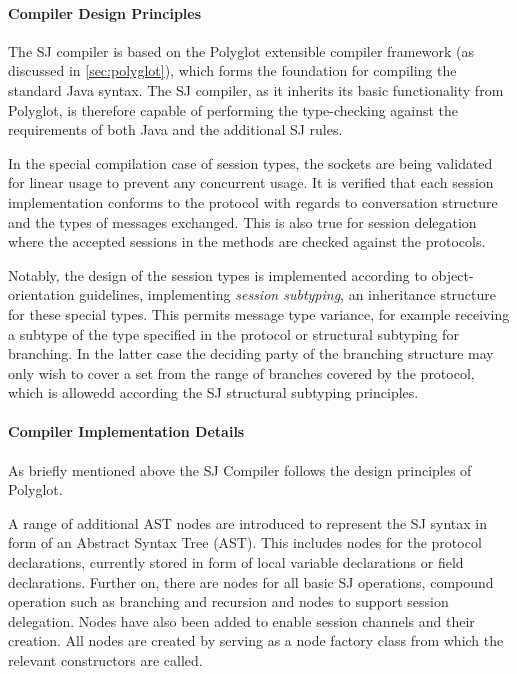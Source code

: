 \paragraph*{Compiler Design Principles}
The SJ compiler is based on the Polyglot extensible compiler framework (as discussed in \autoref{sec:polyglot}), which forms the foundation for compiling the standard Java syntax. The SJ compiler, as it inherits its basic functionality from Polyglot, is therefore capable of performing the type-checking against the requirements of both Java and the additional SJ rules. 

In the special compilation case of session types, the sockets are being validated for linear usage to prevent any concurrent usage. It is verified that each session implementation conforms to the protocol with regards to conversation structure and the types of messages exchanged. This is also true for session delegation where the accepted sessions in the methods are checked against the protocols.

Notably, the design of the session types is implemented according to object-orientation guidelines, implementing \textit{session subtyping}, an inheritance structure for these special types. This permits message type variance, for example receiving a subtype of the type specified in the protocol or structural subtyping for branching. In the latter case the deciding party of the branching structure may only wish to cover a set from the range of branches covered by the protocol, which is allowedd according the SJ structural subtyping principles.

\paragraph*{Compiler Implementation Details}
As briefly mentioned above the SJ Compiler follows the design principles of Polyglot. 

A range of additional AST nodes are introduced to represent the SJ syntax in form of an Abstract Syntax Tree (AST). This includes nodes for the protocol declarations, currently stored in form of local variable declarations or field declarations. Further on, there are nodes for all basic SJ operations, compound operation such as branching and recursion and nodes to support session delegation. Nodes have also been added to enable session channels and their creation. All nodes are created by   serving as a node factory class from which the relevant constructors are called.

